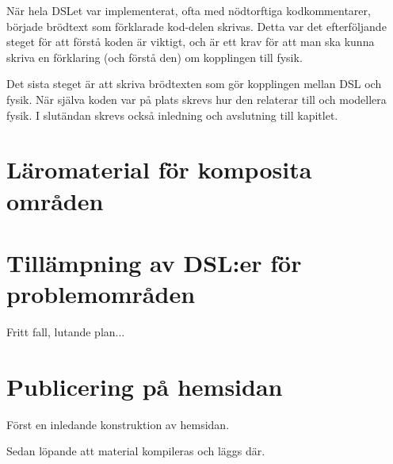 \begin{binge}
När hela DSLet var implementerat, ofta med nödtorftiga kodkommentarer, började brödtext som förklarade kod-delen skrivas. Detta var det efterföljande steget för att förstå koden är viktigt, och är ett krav för att man ska kunna skriva en förklaring (och förstå den) om kopplingen till fysik.

Det sista steget är att skriva brödtexten som gör kopplingen mellan DSL och fysik. När själva koden var på plats skrevs hur den relaterar till och modellera fysik. I slutändan skrevs också inledning och avslutning till kapitlet.

\section{Läromaterial för komposita områden}


\section{Tillämpning av DSL:er för problemområden}

Fritt fall, lutande plan...

\section{Publicering på hemsidan}

Först en inledande konstruktion av hemsidan.

Sedan löpande att material kompileras och läggs där.

\end{binge}
